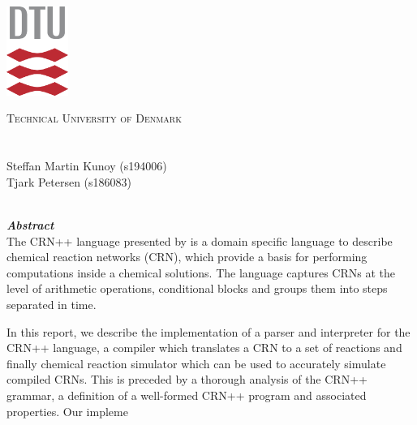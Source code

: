\begin{titlepage}
    \begin{center}
        \includegraphics[width=0.15\textwidth]{Report/frontmatter/dtu.pdf}\par\vspace{0.5cm}
    
        {\scshape\LARGE Technical University of Denmark\\}
    	\vspace{0.5cm}
        {\large \coursenumber\;\coursename}\\
    	\vspace{1.5cm}
    	{\huge\bfseries \projectnamelong\\}
    	\vspace{1.5cm}
    	{\Large Steffan Martin Kunoy (s194006)\\}
            {\Large Tjark Petersen (s186083)\\}
        \vspace{1cm}
    	{\Large \thedate\\}
        \vspace{1cm}

    \end{center}    
    \textbf{\textit{Abstract}}\\
        The CRN++ language presented by \citeauthor{soloveichik2018a} is a domain specific language to describe chemical reaction networks (CRN), which provide a basis for performing computations inside a chemical solutions. The language captures CRNs at the level of arithmetic operations, conditional blocks and groups them into steps separated in time.
        
        In this report, we describe the implementation of a parser and interpreter for the CRN++ language, a compiler which translates a CRN to a set of reactions and finally chemical reaction simulator which can be used to accurately simulate compiled CRNs. This is preceded by a thorough analysis of the CRN++ grammar, a definition of a well-formed CRN++ program and associated properties. Our impleme
 \vfill
\end{titlepage}
\restoregeometry